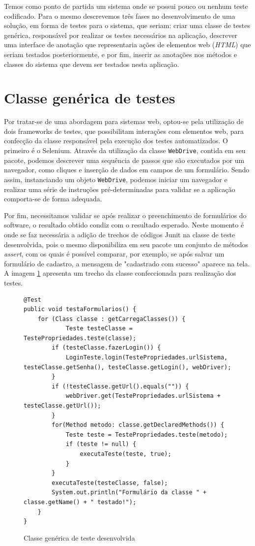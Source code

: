 \documentclass[tg]{mdtufsm}
\begin{document}
Temos como ponto de partida um sistema onde se possui pouco ou nenhum teste codificado. Para o mesmo descrevemos  três fases no desenvolvimento de uma solução, em forma de testes para o sistema,
que seriam: criar uma classe de testes genérica, responsável por realizar os testes necessários na aplicação, descrever uma interface de anotação que representaria ações de elementos web (\emph{HTML}) que
seriam testados posteriormente, e por fim, inserir as anotações nos métodos e classes do sistema que devem ser testados nesta aplicação.

\section{Classe genérica de testes}
Por tratar-se de uma abordagem para sistemas web, optou-se pela utilização de dois frameworks de testes, que possibilitam interações com elementos web, para confecção da classe responsável pela execução dos testes automatizados.
O primeiro é o Selenium. Através da utilização da classe \texttt{WebDrive}, contida em seu pacote, podemos descrever uma sequência de passos que são executados por um navegador, como cliques e inserção de dados em campos de um
formulário. Sendo assim, instanciando um objeto \texttt{WebDrive}, podemos iniciar um navegador e realizar uma série de instruções pré-determinadas para validar se a aplicação comporta-se de forma adequada.

Por fim, necessitamos validar se após realizar o preenchimento de formulários do software, o resultado obtido condiz com o resultado esperado. Neste momento é onde se faz necessária a adição de trechos de códigos Junit na classe de teste
desenvolvida, pois o mesmo disponibiliza em seu pacote um conjunto de métodos \emph{assert}, com os quais é possível comparar, por exemplo, se após salvar um formulário de cadastro, a mensagem de "cadastrado com sucesso" aparece na tela.
A imagem \ref{code:TestaFormularios.java} apresenta um trecho da classe confeccionada para realização dos testes.

\begin{figure}[!htb]
\begin{lstlisting}
@Test
public void testaFormularios() {
	for (Class classe : getCarregaClasses()) {
    		Teste testeClasse = TestePropriedades.teste(classe);
        if (testeClasse.fazerLogin()) {
            LoginTeste.login(TestePropriedades.urlSistema, testeClasse.getSenha(), testeClasse.getLogin(), webDriver);
        }
        if (!testeClasse.getUrl().equals("")) {
            webDriver.get(TestePropriedades.urlSistema + testeClasse.getUrl());
        }
        for(Method metodo: classe.getDeclaredMethods()) {
            Teste teste = TestePropriedades.teste(metodo);
            if (teste != null) {
                executaTeste(teste, true);
            }
        }
        executaTeste(testeClasse, false);
        System.out.println("Formulário da classe " + classe.getName() + " testado!");
	}
}
\end{lstlisting}
    \caption{Classe genérica de teste desenvolvida}
	\label{code:TestaFormularios.java}
\end{figure}
\end{document}
